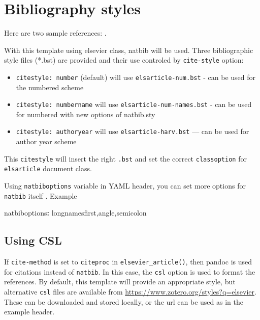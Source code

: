 \documentclass[
  authoryear,
  preprint,
  3p,
  twocolumn]{elsarticle}
\newenvironment{Shaded}{\begin{snugshade}}{\end{snugshade}}
\newcommand{\AttributeTok}[1]{\textcolor[rgb]{0.40,0.45,0.13}{#1}}
\newcommand{\FunctionTok}[1]{\textcolor[rgb]{0.28,0.35,0.67}{#1}}
\newcommand{\KeywordTok}[1]{\textcolor[rgb]{0.00,0.23,0.31}{\textbf{#1}}}
\providecommand{\tightlist}{%
  \setlength{\itemsep}{0pt}\setlength{\parskip}{0pt}}\usepackage{longtable,booktabs,array}
\begin{document}
\section{Bibliography styles}\label{bibliography-styles}

Here are two sample references: \citet{Feynman1963118}
\citet{Dirac1953888}.

With this template using elsevier class, natbib will be used. Three
bibliographic style ﬁles (*.bst) are provided and their use controled by
\texttt{cite-style} option:

\begin{itemize}
\tightlist
\item
  \texttt{citestyle:\ number} (default) will use
  \texttt{elsarticle-num.bst} - can be used for the numbered scheme
\item
  \texttt{citestyle:\ numbername} will use
  \texttt{elsarticle-num-names.bst} - can be used for numbered with new
  options of natbib.sty
\item
  \texttt{citestyle:\ authoryear} will use \texttt{elsarticle-harv.bst}
  --- can be used for author year scheme
\end{itemize}

This \texttt{citestyle} will insert the right \texttt{.bst} and set the
correct \texttt{classoption} for \texttt{elsarticle} document class.

Using \texttt{natbiboptions} variable in YAML header, you can set more
options for \texttt{natbib} itself . Example

\begin{Shaded}
\begin{Highlighting}[]
\FunctionTok{natbiboptions}\KeywordTok{:}\AttributeTok{ longnamesfirst,angle,semicolon}
\end{Highlighting}
\end{Shaded}

\subsection{Using CSL}\label{using-csl}

If \texttt{cite-method} is set to \texttt{citeproc} in
\texttt{elsevier\_article()}, then pandoc is used for citations instead
of \texttt{natbib}. In this case, the \texttt{csl} option is used to
format the references. By default, this template will provide an
appropriate style, but alternative \texttt{csl} files are available from
\url{https://www.zotero.org/styles?q=elsevier}. These can be downloaded
and stored locally, or the url can be used as in the example header.
\end{document}
